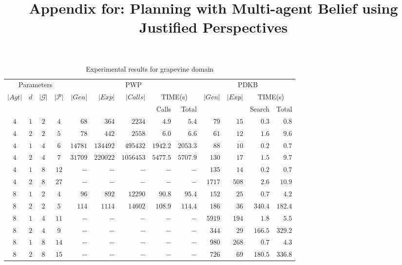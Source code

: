 \documentclass[letterpaper]{article} %
\title{Appendix for: Planning with Multi-agent Belief using Justified Perspectives}
\begin{document}
\maketitle


\begin{table*}[ht]
    \centering
    \small
    \begin{tabular}{ccccrrrrrrrrr}
         \toprule
          \multicolumn{4}{c}{Parameters} & \multicolumn{5}{c}{PWP} & \multicolumn{4}{c}{PDKB} \\ 
          \cmidrule(lr){1-4} \cmidrule(lr){5-9} \cmidrule(lr){10-13}
          \multirow{2}{*}{$|Agt|$} & \multirow{2}{*}{$d$} & \multirow{2}{*}{$|\mathcal{G}|$} & \multirow{2}{*}{$|\mathcal{P}|$} & \multirow{2}{*}{$|Gen|$} & \multirow{2}{*}{$|Exp|$} & \multirow{2}{*}{$|Calls|$} & \multicolumn{2}{c}{TIME(s)} & \multirow{2}{*}{$|Gen|$} & \multirow{2}{*}{$|Exp|$}&\multicolumn{2}{c}{TIME(s)}
          \\ & & & & & & & {Calls} & Total & & & Search & Total \\
         \midrule

            $4$ & $1$ & $2$ & $4$ & $68$ & $364$ & $2234$ & $4.9$ & $5.4$ & $79$ & $15$ & $0.3$& $0.8$\\
            $4$ & $2$ & $2$ & $5$ & $78$ & $442$ & $2558$ & $6.0$ & $6.6$ & $61$ & $12$ & $1.6$ & $9.6$\\
            $4$ & $1$ & $4$ & $6$ & $14781$ & $134492$ & $495432$ & $1942.2$ & $2053.3$ & $88$ & $10$ & $0.2$ & $0.7$\\
            $4$ & $2$ & $4$ & $7$ & $31709$ & $220022$ & $1056453$ & $5477.5$ & $5707.9$ & $130$ & $17$ & $1.5$ & $9.7$\\
            $4$ & $1$ & $8$ & $12$ & $-$ & $-$ & $-$ & $-$ & $-$ & $135$ & $14$ & $0.2$ & $0.7$\\
            $4$ & $2$ & $8$ & $27$ & $-$ & $-$ & $-$ & $-$ & $-$ & $1717$ & $508$ & $2.6$ & $10.9$\\
            
            $8$ & $1$ & $2$ & $4$ & $96$ & $892$ & $12290$ & $90.8$ & $95.4$ & $152$ & $25$ & $0.7$ & $4.2$\\
            $8$ & $2$ & $2$ & $5$ & $114$ & $1114$ & $14602$ & $108.9$ & $114.4$ & $186$ & $36$ & $340.4$ & $182.4$\\
            $8$ & $1$ & $4$ & $11$ & $-$ & $-$ & $-$ & $-$ & $-$ & $5919$ & $194$ & $1.8$ & $5.5$\\
            $8$ & $2$ & $4$ & $9$ & $-$ & $-$ & $-$ & $-$ & $-$ & $344$ & $29$ & $166.5$ & $329.2$\\
            $8$ & $1$ & $8$ & $14$ & $-$ & $-$ & $-$ & $-$ & $-$ & $980$ & $268$ & $0.7$ & $4.3$\\
            $8$ & $2$ & $8$ & $15$ & $-$ & $-$ & $-$ & $-$ & $-$ & $726$ & $69$ & $180.5$ & $336.8$\\
                  
        \bottomrule
    \end{tabular}
    \caption{Experimental results for grapevine domain}
    \label{tab:grapevine}
\end{table*}
\end{document}
